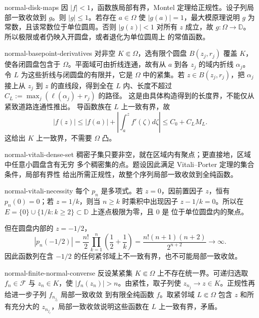 \begin{solution}{normal-disk-maps}
因 $|f|<1$，函数族局部有界，Montel 定理给正规性。设子列局部一致收敛到
$g$。则 $|g|\le1$。若存在 $a\in\Omega$ 使 $|g(a)|=1$，最大模原理说明
$g$ 为常数，且该常数位于单位圆周。否则 $|g(z)|<1$ 对所有 $z$ 成立，故
$g:\Omega\to\mathbb D$。所以极限或者仍映入开圆盘，或者退化为单位圆周上
的常值函数。
\end{solution}

\begin{solution}{normal-basepoint-derivatives}
对非空 $K\Subset\Omega$，选有限个圆盘 $B(z_j,r_j)$ 覆盖 $K$，
使各闭圆盘包含于 $\Omega$。平面域可由折线连通，故有从 $a$ 到各 $z_j$
的域内折线 $\alpha_j$。令 $L$ 为这些折线与闭圆盘的有限并，它是
$\Omega$ 中的紧集。若 $z\in B(z_j,r_j)$，把 $\alpha_j$ 接上从 $z_j$
到 $z$ 的直线段，得到全在 $L$ 内、长度不超过
$C_L:=\max_j(\ell(\alpha_j)+r_j)$ 的路径。
这是由具体构造得到的长度界，不能仅从紧致道路连通性推出。
导函数族在 $L$ 上一致有界，故
\[
 |f(z)|\le |f(a)|+\left|\int_a^z f'(\zeta)d\zeta\right|
 \le C_0+C_LM_L.
\]
这给出 $K$ 上一致界，不需要 $\Omega$ 凸。
\end{solution}

\begin{solution}{normal-vitali-dense-set}
稠密子集只要非空，就在区域内有聚点；更直接地，区域中任意小圆盘含有无穷
多个稠密集的点。题设因此满足 Vitali--Porter 定理的集合条件，局部有界性
给出所需正规性，故整个序列局部一致收敛到全纯函数。
\end{solution}

\begin{solution}{normal-vitali-necessity}
每个 $p_n$ 是多项式。若 $z=0$，因前置因子 $z$，恒有 $p_n(0)=0$；若
$z=1/k$，则当 $n\ge k$ 时乘积中出现因子 $z-1/k=0$。所以在
$E=\{0\}\cup\{1/k:k\ge2\}\subset\mathbb D$ 上逐点极限为零，且 $0$ 是
位于单位圆盘内的聚点。

但在圆盘内部的 $z=-1/2$，
\[
 |p_n(-1/2)|
 =\frac{n!}{2}\prod_{k=1}^n\left(\frac12+\frac1k\right)
 =\frac{n!(n+1)(n+2)}{2^{n+2}}\to\infty.
\]
因此函数列在含 $-1/2$ 的任何紧邻域上不一致有界，也不可能局部一致收敛。
\end{solution}

\begin{solution}{normal-finite-normal-converse}
反设某紧集 $K\Subset\Omega$ 上不存在统一界。可递归选取
$f_n\in\mathcal F$ 与 $z_n\in K$，使 $|f_n(z_n)|>n$。由紧性，取子列使
$z_{n_j}\to z\in K$。正规性再给进一步子列 $f_{n_{j_\ell}}$ 局部一致收敛
到有限全纯函数 $f$。取紧邻域 $L\Subset\Omega$ 包含 $z$ 和所有充分大的
$z_{n_{j_\ell}}$，局部一致收敛说明这些函数在 $L$ 上一致有界，矛盾。
\end{solution}

